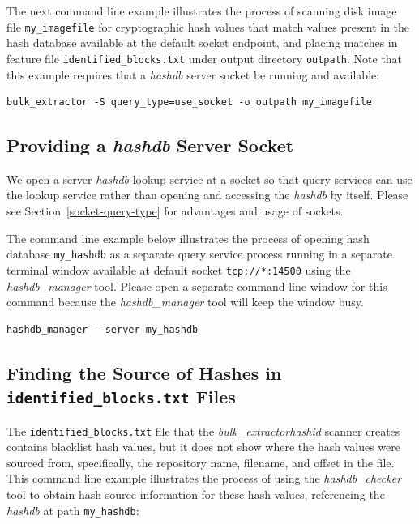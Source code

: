 \documentclass[11pt,twoside]{article}
\newcommand \bulk {\textit{bulk\_extractor}\xspace}
\newcommand \hdb {\textit{hashdb}\xspace}
\newcommand \hdbm {\textit{hashdb\_manager}\xspace}
\newcommand \hdbc {\textit{hashdb\_checker}\xspace}
\newcommand \hid {\textit{hashid}\xspace}
\begin{document}
The next command line example illustrates the process of scanning
disk image file \texttt{my\_imagefile}
for cryptographic hash values that match values present
in the hash database available at the default socket endpoint,
and placing
matches in feature file \texttt{identified\_blocks.txt}
under output directory \texttt{outpath}.
Note that this example requires that a \hdb server socket be running
and available:

\begin{small}
\begin{verbatim}
bulk_extractor -S query_type=use_socket -o outpath my_imagefile
\end{verbatim}
\end{small}

\subsection{Providing a \hdb Server Socket}
We open a server \hdb lookup service at a socket
so that query services can use the lookup service rather than
opening and accessing the \hdb by itself.
Please see Section~\ref{socket-query-type} for advantages and usage of sockets.

The command line example below illustrates the process of opening
hash database \texttt{my\_hashdb} as a separate
query service process running in a separate terminal window
available at default socket \texttt{tcp://*:14500}
using the \hdbm tool.
Please open a separate command line window for this command
because the \hdbm tool will keep the window busy.

\begin{small}
\begin{verbatim}
hashdb_manager --server my_hashdb
\end{verbatim}
\end{small}

\subsection{Finding the Source of Hashes in \texttt{identified\_blocks.txt} Files}
The \texttt{identified\_blocks.txt} file that the \bulk \hid scanner creates
contains blacklist hash values,
but it does not show where the hash values were sourced from,
specifically, the repository name, filename, and offset in the file.
This command line example illustrates the process of
using the \hdbc tool to obtain
hash source information for these hash values,
referencing the \hdb at path \texttt{my\_hashdb}:
\end{document}
